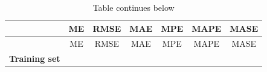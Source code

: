 \documentclass[
]{article}
\begin{document}
\begin{longtable}[]{@{}ccccccc@{}}
\caption{Table continues below}\tabularnewline
\toprule
\begin{minipage}[b]{0.20\columnwidth}\centering
~\strut
\end{minipage} & \begin{minipage}[b]{0.10\columnwidth}\centering
ME\strut
\end{minipage} & \begin{minipage}[b]{0.10\columnwidth}\centering
RMSE\strut
\end{minipage} & \begin{minipage}[b]{0.09\columnwidth}\centering
MAE\strut
\end{minipage} & \begin{minipage}[b]{0.10\columnwidth}\centering
MPE\strut
\end{minipage} & \begin{minipage}[b]{0.10\columnwidth}\centering
MAPE\strut
\end{minipage} & \begin{minipage}[b]{0.10\columnwidth}\centering
MASE\strut
\end{minipage}\tabularnewline
\midrule
\endfirsthead
\toprule
\begin{minipage}[b]{0.20\columnwidth}\centering
~\strut
\end{minipage} & \begin{minipage}[b]{0.10\columnwidth}\centering
ME\strut
\end{minipage} & \begin{minipage}[b]{0.10\columnwidth}\centering
RMSE\strut
\end{minipage} & \begin{minipage}[b]{0.09\columnwidth}\centering
MAE\strut
\end{minipage} & \begin{minipage}[b]{0.10\columnwidth}\centering
MPE\strut
\end{minipage} & \begin{minipage}[b]{0.10\columnwidth}\centering
MAPE\strut
\end{minipage} & \begin{minipage}[b]{0.10\columnwidth}\centering
MASE\strut
\end{minipage}\tabularnewline
\midrule
\endhead
\begin{minipage}[t]{0.20\columnwidth}\centering
\textbf{Training set}\strut
\end{minipage} & \begin{minipage}[t]{0.10\columnwidth}\centering

\end{minipage}
\end{longtable}
\end{document}
